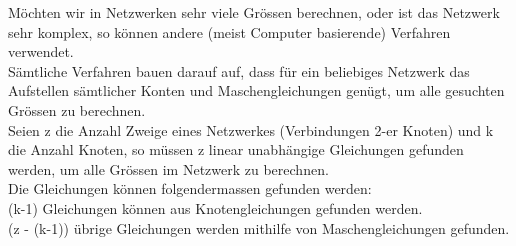 					           Möchten wir in Netzwerken sehr viele Grössen berechnen, oder ist das Netzwerk sehr komplex, so können andere (meist Computer basierende) Verfahren verwendet. \\
					           Sämtliche Verfahren bauen darauf auf, dass für ein beliebiges Netzwerk das Aufstellen sämtlicher Konten und Maschengleichungen genügt, um alle gesuchten Grössen zu berechnen. \\

					          \beginip
					             Seien z die Anzahl Zweige eines Netzwerkes (Verbindungen 2-er Knoten) und k die Anzahl Knoten, so müssen z linear unabhängige Gleichungen gefunden werden, um alle Grössen im Netzwerk zu berechnen.  \\Die Gleichungen können folgendermassen gefunden werden: \\
					             \formulaBegin
					              (k-1) Gleichungen können aus Knotengleichungen gefunden werden. \\
					              (z - (k-1)) übrige Gleichungen werden mithilfe von Maschengleichungen gefunden.
					             \formulaEnd
					           \iend



